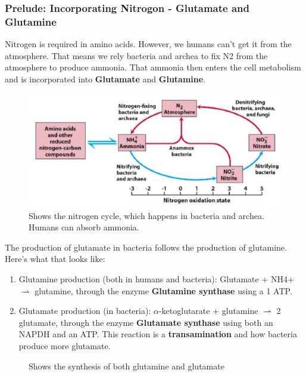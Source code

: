\documentclass[../main.tex]{subfiles}
\begin{document}
\subsubsection{Prelude: Incorporating Nitrogon - Glutamate and Glutamine}

Nitrogen is required in amino acids. However, we humans can't get it from the atmosphere. That means we rely bacteria and archea to fix N2 from the atmosphere to produce ammonia. That ammonia then enters the cell metabolism and is incorporated into \textbf{\gls{Glutamate}} and \textbf{\gls{Glutamine}}.

\begin{figure}[H]
	\centering
	\includegraphics[width=0.4\linewidth]{nit_cyc}
	\caption{Shows the nitrogen cycle, which happens in bacteria and archea. Humans can absorb ammonia.}
	\label{fig:nitcyc}
\end{figure}

The production of glutamate in bacteria follows the production of glutamine. Here's what that looks like:
\begin{enumerate}
	\item Glutamine production (both in humans and bacteria): Glutamate + NH4+ $\rightharpoonup$ glutamine, through the enzyme \textbf{\gls{Glutamine synthase}} using a 1 ATP.
	\item Glutamate production (in bacteria): $\alpha$-ketoglutarate + glutamine $\rightharpoonup$ 2 glutamate, through the enzyme \textbf{\gls{Glutamate synthase}} using both an NAPDH and an ATP. This reaction is a \textbf{transamination} and how bacteria produce more glutamate.
\end{enumerate}

\begin{figure}[H]
	\centering
	\hfill
	\caption{Shows the synthesis of both glutamine and glutamate}
\end{figure}
\end{document}

